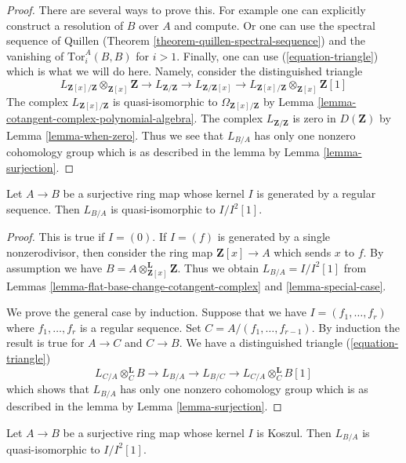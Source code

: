 \begin{proof}
There are several ways to prove this. For example one can explicitly construct
a resolution of $B$ over $A$ and compute. Or one can use the spectral sequence
of Quillen (Theorem \ref{theorem-quillen-spectral-sequence})
and the vanishing of $\text{Tor}_i^A(B, B)$ for $i > 1$.
Finally, one can use (\ref{equation-triangle}) which is what we will do here.
Namely, consider the distinguished triangle
$$
L_{\mathbf{Z}[x]/\mathbf{Z}} \otimes_{\mathbf{Z}[x]} \mathbf{Z} \to
L_{\mathbf{Z}/\mathbf{Z}} \to
L_{\mathbf{Z}/\mathbf{Z}[x]}\to
L_{\mathbf{Z}[x]/\mathbf{Z}} \otimes_{\mathbf{Z}[x]} \mathbf{Z}[1]
$$
The complex $L_{\mathbf{Z}[x]/\mathbf{Z}}$ is quasi-isomorphic to
$\Omega_{\mathbf{Z}[x]/\mathbf{Z}}$ by
Lemma \ref{lemma-cotangent-complex-polynomial-algebra}.
The complex $L_{\mathbf{Z}/\mathbf{Z}}$ is zero in $D(\mathbf{Z})$ by
Lemma \ref{lemma-when-zero}.
Thus we see that $L_{B/A}$ has only one nonzero cohomology group
which is as described in the lemma by Lemma \ref{lemma-surjection}.
\end{proof}

\begin{lemma}
\label{lemma-mod-regular-sequence}
Let $A \to B$ be a surjective ring map whose kernel $I$ is generated
by a regular sequence. Then $L_{B/A}$ is quasi-isomorphic to $I/I^2[1]$.
\end{lemma}

\begin{proof}
This is true if $I = (0)$. If $I = (f)$ is generated by a single
nonzerodivisor, then consider the ring map $\mathbf{Z}[x] \to A$
which sends $x$ to $f$. By assumption we have
$B = A \otimes_{\mathbf{Z}[x]}^\mathbf{L} \mathbf{Z}$.
Thus we obtain $L_{B/A} = I/I^2[1]$ from
Lemmas \ref{lemma-flat-base-change-cotangent-complex} and
\ref{lemma-special-case}.

\medskip\noindent
We prove the general case by induction. Suppose that we have
$I = (f_1, \ldots, f_r)$ where $f_1, \ldots, f_r$ is a regular sequence.
Set $C = A/(f_1, \ldots, f_{r - 1})$. By induction the result is
true for $A \to C$ and $C \to B$. We have a distinguished triangle
(\ref{equation-triangle})
$$
L_{C/A} \otimes_C^\mathbf{L} B \to L_{B/A} \to L_{B/C} \to
L_{C/A} \otimes_C^\mathbf{L} B[1]
$$
which shows that $L_{B/A}$ has only one nonzero cohomology group
which is as described in the lemma by Lemma \ref{lemma-surjection}.
\end{proof}

\begin{lemma}
\label{lemma-mod-Koszul-regular-ideal}
Let $A \to B$ be a surjective ring map whose kernel $I$ is Koszul.
Then $L_{B/A}$ is quasi-isomorphic to $I/I^2[1]$.
\end{lemma}

